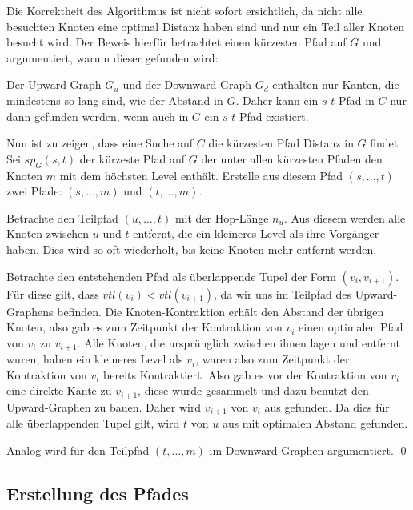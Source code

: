 Die Korrektheit des Algorithmus ist nicht sofort ersichtlich, da nicht alle besuchten Knoten eine optimal Distanz haben sind und nur ein Teil aller Knoten besucht wird.
Der Beweis hierfür betrachtet einen kürzesten Pfad auf $G$ und argumentiert, warum dieser gefunden wird:

\begin{beweis}\label{ch:proof:correct}
  Der Upward-Graph $G_u$ und der Downward-Graph $G_d$ enthalten nur Kanten, die mindestens so lang sind, wie der Abstand in $G$.
  Daher kann ein $s$-$t$-Pfad in $C$ nur dann gefunden werden, wenn auch in $G$ ein $s$-$t$-Pfad existiert.

  Nun ist zu zeigen, dass eine Suche auf $C$ die kürzesten Pfad Distanz in $G$ findet
  Sei ${sp}_G(s, t)$ der kürzeste Pfad auf $G$ der unter allen kürzesten Pfaden den Knoten $m$ mit dem höchsten Level enthält.
  Erstelle aus diesem Pfad $(s, \dotsc, t)$ zwei Pfade: $(s, \dotsc, m)$ und $(t, \dotsc, m)$.

  Betrachte den Teilpfad $(u, \dotsc, t)$ mit der Hop-Länge $n_u$.
  Aus diesem werden alle Knoten zwischen $u$ und $t$ entfernt, die ein kleineres Level als ihre Vorgänger haben.
  Dies wird so oft wiederholt, bis keine Knoten mehr entfernt werden.

  Betrachte den entstehenden Pfad als überlappende Tupel der Form $(v_{i}, v_{i + 1})$.
  Für diese gilt, dass ${vtl}(v_i) < {vtl}(v_{i + 1})$, da wir uns im Teilpfad des Upward-Graphens befinden.
  Die Knoten-Kontraktion erhält den Abstand der übrigen Knoten, also gab es zum Zeitpunkt der Kontraktion von $v_i$ einen optimalen Pfad von $v_i$ zu $v_{i + 1}$.
  Alle Knoten, die ursprünglich zwischen ihnen lagen und entfernt wuren, haben ein kleineres Level als $v_i$, waren also zum Zeitpunkt der Kontraktion von $v_i$ bereits Kontraktiert.
  Also gab es vor der Kontraktion von $v_i$ eine direkte Kante zu $v_{i + 1}$, diese wurde gesammelt und dazu benutzt den Upward-Graphen zu bauen.
  Daher wird $v_{i + 1}$ von $v_i$ aus gefunden.
  Da dies für alle überlappenden Tupel gilt, wird $t$ von $u$ aus mit optimalen Abstand gefunden.

  Analog wird für den Teilpfad $(t, \dotsc, m)$ im Downward-Graphen argumentiert.
  \qed
\end{beweis}

\subsection{Erstellung des Pfades}\label{ch:subsection:pfad_gewinnung}

